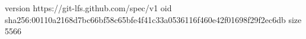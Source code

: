 version https://git-lfs.github.com/spec/v1
oid sha256:00110a2168d7bc66bf58c65bfe4f41c33a0536116f460e42f01698f29f2ec6db
size 5566
